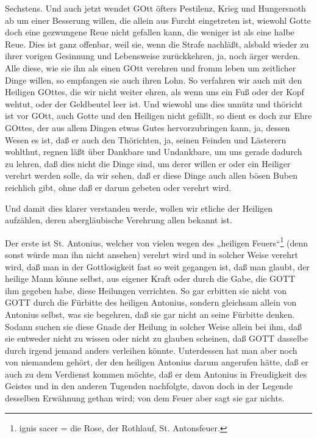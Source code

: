 Sechstens. Und auch jetzt wendet GOtt öfters Pestilenz, Krieg und Hungersnoth ab um einer Besserung willen, die allein aus Furcht eingetreten ist, wiewohl Gotte doch eine gezwungene Reue nicht gefallen kann, die weniger ist als eine halbe Reue. Dies ist ganz offenbar, weil sie, wenn die Strafe nachläßt, alsbald wieder zu ihrer vorigen Gesinnung und Lebensweise zurückkehren, ja, noch ärger werden. Alle diese, wie sie ihn als einen GOtt verehren und fromm leben um zeitlicher Dinge willen, so empfangen sie auch ihren Lohn. So verfahren wir auch mit den Heiligen GOttes, die wir nicht weiter ehren, als wenn uns ein Fuß oder der Kopf wehtut, oder der Geldbeutel leer ist. Und wiewohl uns dies unnütz und thöricht ist vor GOtt, auch Gotte und den Heiligen nicht gefällt, so dient es doch zur Ehre GOttes, der aus allem Dingen etwas Gutes hervorzubringen kann, ja, dessen Wesen es ist, daß er auch den Thörichten, ja, seinen Feinden und Lästerern wohlthut, regnen läßt über Dankbare und Undankbare, um uns gerade dadurch zu lehren, daß dies nicht die Dinge sind, um derer willen er oder ein Heiliger verehrt werden solle, da wir sehen, daß er diese Dinge auch allen bösen Buben reichlich gibt, ohne daß er darum gebeten oder verehrt wird.

Und damit dies klarer verstanden werde, wollen wir etliche der Heiligen aufzählen, deren abergläubische Verehrung allen bekannt ist.

Der erste ist St. Antonius, welcher von vielen wegen des „heiligen Feuers“\footnote{ignis sacer = die Rose, der Rothlauf, St. Antonsfeuer.} (denn sonst würde man ihn nicht ansehen) verehrt wird und in solcher
Weise verehrt wird, daß man in der Gottlosigkeit fast so weit gegangen ist, daß man glaubt, der heilige Mann könne selbst, aus eigener Kraft oder durch die Gabe, die GOTT ihm gegeben habe, diese Heilungen verrichten. So gar erbitten sie nicht von GOTT durch die Fürbitte des heiligen Antonius, sondern gleichsam allein von Antonius selbst, was sie begehren, daß sie gar nicht an seine Fürbitte denken. Sodann suchen sie diese Gnade der Heilung in solcher Weise allein bei ihm, daß sie entweder nicht zu wissen oder nicht zu glauben scheinen, daß GOTT dasselbe durch irgend jemand anders verleihen könnte. Unterdessen hat man aber noch von niemandem gehört, der den heiligen Antonius darum angerufen hätte, daß er auch zu dem Verdienst kommen möchte, daß er dem Antonius in Freudigkeit des Geistes und in den anderen Tugenden nachfolgte, davon doch in der Legende desselben Erwähnung gethan wird; von dem Feuer aber sagt sie gar nichts.

